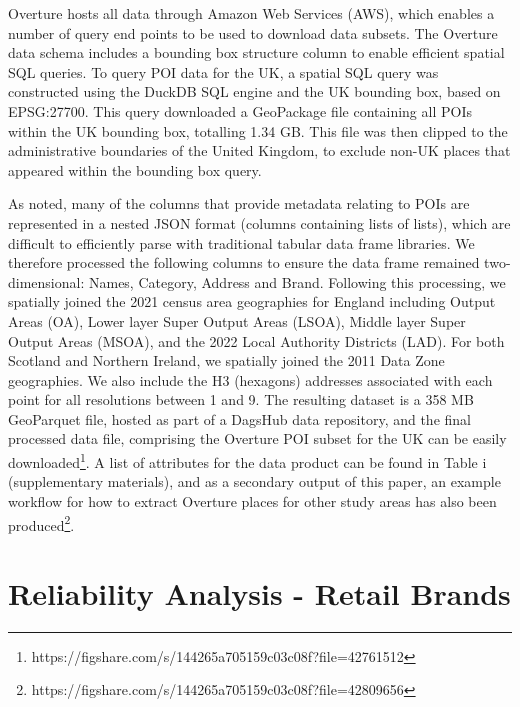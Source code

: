 \documentclass[
]{article}
\begin{document}
Overture hosts all data through Amazon Web Services (AWS), which enables
a number of query end points to be used to download data subsets. The
Overture data schema includes a bounding box structure column to enable
efficient spatial SQL queries. To query POI data for the UK, a spatial
SQL query was constructed using the DuckDB SQL engine and the UK
bounding box, based on EPSG:27700. This query downloaded a GeoPackage
file containing all POIs within the UK bounding box, totalling 1.34 GB.
This file was then clipped to the administrative boundaries of the
United Kingdom, to exclude non-UK places that appeared within the
bounding box query.

As noted, many of the columns that provide metadata relating to POIs are
represented in a nested JSON format (columns containing lists of lists),
which are difficult to efficiently parse with traditional tabular data
frame libraries. We therefore processed the following columns to ensure
the data frame remained two-dimensional: Names, Category, Address and
Brand. Following this processing, we spatially joined the 2021 census
area geographies for England including Output Areas (OA), Lower layer
Super Output Areas (LSOA), Middle layer Super Output Areas (MSOA), and
the 2022 Local Authority Districts (LAD). For both Scotland and Northern
Ireland, we spatially joined the 2011 Data Zone geographies. We also
include the H3 (hexagons) addresses associated with each point for all
resolutions between 1 and 9. The resulting dataset is a 358 MB
GeoParquet file, hosted as part of a DagsHub data repository, and the
final processed data file, comprising the Overture POI subset for the UK
can be easily downloaded\footnote{https://figshare.com/s/144265a705159c03c08f?file=42761512}.
A list of attributes for the data product can be found in Table i
(supplementary materials), and as a secondary output of this paper, an
example workflow for how to extract Overture places for other study
areas has also been produced\footnote{https://figshare.com/s/144265a705159c03c08f?file=42809656}.

\section{Reliability Analysis - Retail
Brands}\label{reliability-analysis---retail-brands}
\end{document}

